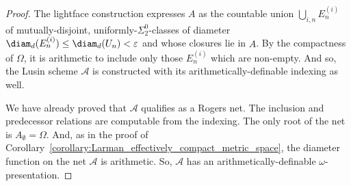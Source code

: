 \begin{proof}
    
    The lightface construction expresses $A$ as the countable union $\bigcup_{i, n} E^{(i)}_n$ of mutually-disjoint, uniformly-$\Sigma^0_2$-classes of diameter $\diam_d(E^{(i)}_n) \leq \diam_d(U_n) < \varepsilon$ and whose closures lie in $A$. By the compactness of $\Omega$, it is arithmetic to include only those $E^{(i)}_n$ which are non-empty. And so, the Lusin scheme $\mathcal{A}$ is constructed with its arithmetically-definable indexing as well. 
    
    We have already proved that $\mathcal{A}$ qualifies as a Rogers net. The inclusion and predecessor relations are computable from the indexing. The only root of the net is $A_\emptyset = \Omega$. And, as in the proof of Corollary~\ref{corollary:Larman_effectively_compact_metric_space}, the diameter function on the net $\mathcal{A}$ is arithmetic. So, $\mathcal{A}$ has an arithmetically-definable $\omega$-presentation. 
\end{proof}
